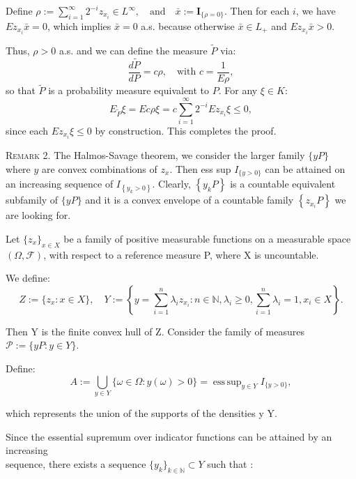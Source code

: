 \documentclass[review]{elsarticle}
\begin{document}
Define
$
\rho := \sum_{i=1}^{\infty} 2^{-i} z_{x_i} \in L^\infty, \quad \text{and} \quad \bar{x} := \mathbf{I}_{\{\rho = 0\}}.
$
Then for each $i$, we have $Ez_{x_i} \bar{x} = 0$, which implies $\bar{x} = 0$ a.s. because otherwise $\bar{x} \in L_+$ and $Ez_{x_i} \bar{x} > 0$.

Thus, $\rho > 0$ a.s. and we can define the measure $\widetilde{P}$ via:
$$
\frac{d\widetilde{P}}{dP} = c \rho, \quad \text{with } c = \frac{1}{E\rho},
$$
so that $\widetilde{P}$ is a probability measure equivalent to $P$. For any $\xi \in K$:
$$
E_{\widetilde{P}}\xi = Ec \rho \xi = c \sum_{i=1}^{\infty} 2^{-i} Ez_{x_i} \xi \leq 0,
$$
since each $Ez_{x_i} \xi \leq 0$ by construction. This completes the proof.


















\hspace{0.5cm}\textsc{Remark 2.} The Halmos-Savage theorem, we consider the larger family $\{y P\}$ where $y$ are convex combinations of $z_x$. Then ess sup $I_{\{y>0\}}$ can be attained on an increasing sequence of $I_{\left\{y_k>0\right\}}$. Clearly, $\left\{y_k P\right\}$ is a countable equivalent subfamily of $\{y P\}$ and it is a convex envelope of a countable family $\left\{z_{x_i} P\right\}$ we are looking for.


Let $\{z_x\}_{x \in X}$ be a family of positive measurable functions on a measurable space $(\Omega, \mathcal{F})$, with respect to a reference measure P, where X is uncountable.

We define:
$$
Z := \{ z_x : x \in X \}, \quad Y := \left\{ y = \sum_{i=1}^n \lambda_i z_{x_i} : n \in \mathbb{N}, \lambda_i \geq 0, \sum_{i=1}^n \lambda_i = 1, x_i \in X \right\}.
$$


Then Y is the finite convex hull of Z. Consider the family of measures $\mathcal{P} := \{ y P : y \in Y \}.$

Define:
$$
A := \bigcup_{y \in Y} \{ \omega \in \Omega : y(\omega) > 0 \} = \operatorname{ess\,sup}_{y \in Y} I_{\{ y > 0 \}},
$$

which represents the union of the supports of the densities y \in Y.

Since the essential supremum over indicator functions can be attained by an increasing \\ sequence, there exists a sequence $\{y_k\}_{k \in \mathbb{N}} \subset Y$ such that :
\end{document}
